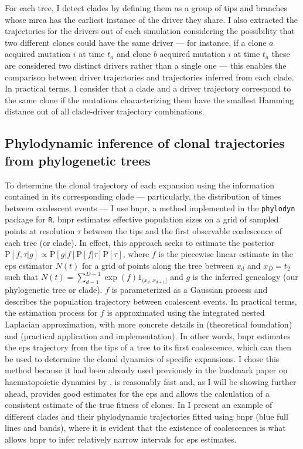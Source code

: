 For each tree, I detect clades by defining them as a group of tips and branches whose \ac{mrca} has the earliest instance of the driver they share. I also extracted the trajectories for the drivers out of each simulation considering the possibility that two different clones could have the same driver --- for instance, if a clone $a$ acquired mutation $i$ at time $t_a$ and clone $b$ acquired mutation $i$ at time $t_a$ these are considered two distinct drivers rather than a single one --- this enables the comparison between driver trajectories and trajectories inferred from each clade. In practical terms, I consider that a clade and a driver trajectory correspond to the same clone if the mutations characterizing them have the smallest Hamming distance out of all clade-driver trajectory combinations. 

\subsection{Phylodynamic inference of clonal trajectories from phylogenetic trees}

To determine the clonal trajectory of each expansion using the information contained in its corresponding clade --- particularly, the distribution of times between coalescent events --- I use \ac{bnpr}, a method implemented in the \texttt{phylodyn} \cite{Lan2015-sw,Karcher2017-kt} package for \texttt{R}. \ac{bnpr} estimates effective population sizes on a grid of sampled points at resolution $\tau$ between the tips and the first observable coalescence of each tree (or clade). In effect, this approach seeks to estimate the posterior $\mathrm{P}[f,\tau|g] \propto \mathrm{P}[g|f]\mathrm{P}[f|\tau]\mathrm{P}[\tau]$, where $f$ is the piecewise linear estimate in the \ac{eps} estimator $N(t)$ for a grid of points along the tree between $x_d$ and $x_D=t_2$ such that $N(t) = \sum^{D-1}_{d-1}\exp(f)1_{(x_d,x_{d+1}]}$ and $g$ is the inferred genealogy (our phylogenetic tree or clade). $f$ is parameterized as a Gaussian process and describes the population trajectory between coalescent events. In practical terms, the estimation process for $f$ is approximated using the integrated nested Laplacian approximation, with more concrete details in \cite{Lan2015-sw} (theoretical foundation) and \cite{Karcher2017-kt} (practical application and implementation). In other words, \ac{bnpr} estimates the \ac{eps} trajectory from the tips of a tree to its first coalescence, which can then be used to determine the clonal dynamics of specific expansions. I chose this method because it had been already used previously in the landmark paper on haematopoietic dynamics by , is reasonably fast and, as I will be showing further ahead, provides good estimates for the \ac{eps} and allows the calculation of a consistent estimate of the true fitness of clones. In  I present an example of different clades and their phylodynamic trajectories fitted using \ac{bnpr} (blue full lines and bands), where it is evident that the existence of coalescences is what allows \ac{bnpr} to infer relatively narrow intervals for \ac{eps} estimates.

